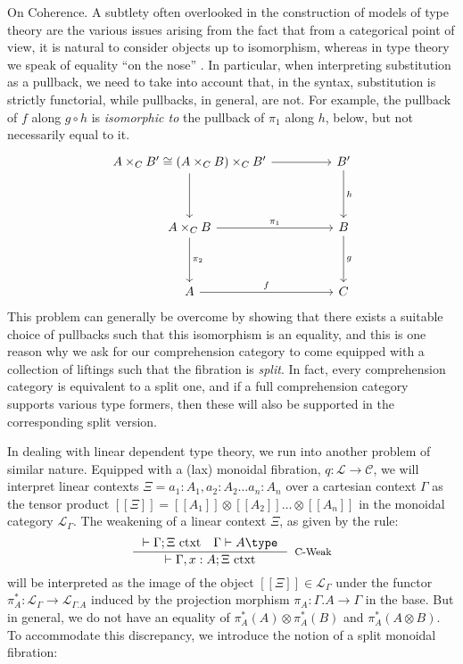 \begin{remrk}On Coherence. A subtlety often overlooked in the construction of models of type theory are the various issues arising from the fact that from a categorical point of view, it is natural to consider objects up to isomorphism, whereas in type theory we speak of equality ``on the nose'' \cite{lccc}. In particular, when interpreting substitution as a pullback, we need to take into account that, in the syntax, substitution is strictly functorial, while pullbacks, in general, are not. For example, the pullback of $f$ along $g \circ h$ is \textit{isomorphic to} the pullback of $\pi_1$ along $h$, below, but not necessarily equal to it.
  \[
    \ti
    A \times_C B' \cong (A \times_C B) \times_C B'  \ar[r] \ar[d] & B' \ar[d, "h"]\\
    A \times_C B \ar[r, "\pi_1"] \ar[d, "\pi_2"] & B \ar[d, "g"]\\
    A \ar[r,"f"] & C
    \kz
  \]
  This problem can generally be overcome by showing that there exists a suitable choice of pullbacks such that this isomorphism is an equality, and this is one reason why we ask for our comprehension category to come equipped with a collection of liftings such that the fibration is \textit{split}. In fact, every comprehension category is equivalent to a split one, and if a full comprehension category supports various type formers, then these will also be supported in the corresponding split version. \cite{pllcoherence}

  
  In dealing with linear dependent type theory, we run into another problem of similar nature. Equipped with a (lax) monoidal fibration, $q : \mathcal{L} \to \mathcal{C}$, we will interpret linear contexts $\Xi = a_1 : A_1, a_2 : A_2 \dots a_n : A_n$ over a cartesian context $\Gamma$ as the tensor product $[[\Xi]] = [[A_1]] \otimes [[A_2]] \dots \otimes [[A_n]]$ in the monoidal category $\mathcal{L}_\Gamma$. The weakening of a linear context $\Xi$, as given by the rule:
  \[\inference{\vdash \Gamma; \Xi \text{ ctxt} \quad \Gamma \vdash A \type}{\vdash \Gamma, x : A; \Xi \text{ ctxt}}[C-Weak]
  \]
  will be interpreted as the image of the object $[[\Xi]] \in \mathcal{L}_\Gamma$ under the functor $\pi_A^* : \mathcal{L}_\Gamma \to \mathcal{L}_{\Gamma.A}$ induced by the projection morphism $\pi_A : \Gamma.A \to \Gamma$ in the base. But in general, we do not have an equality of $\pi_A^*(A) \otimes \pi_A^*(B)$ and $\pi_A^*(A \otimes B)$. To accommodate this discrepancy, we introduce the notion of a split monoidal fibration:
\end{remrk}
